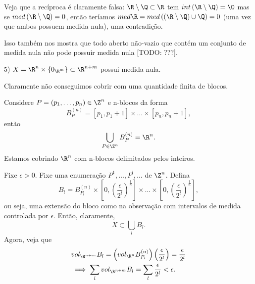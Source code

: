 \begin{note}
    Veja que a recíproca é claramente falsa:
    $\R \setminus \Q\subset \R$ tem $int\left( \R\setminus \Q \right) =\O$ mas se $med\left( \R \setminus \Q \right) = 0$, então teríamos $med \R = med\left( \left( \R \setminus \Q \right) \cup \Q \right) = 0$ (uma vez que ambos possuem medida nula), uma contradição.

    Isso também nos mostra que todo aberto não-vazio que contém um conjunto de medida nula não pode possuir medida nula [TODO: ???].
\end{note}

\begin{eg}
    5) $X =  \R^{n} \times \left\{ 0_{\R^{m}} \right\} \subset \R^{n+m}$ possui medida nula.

    Claramente não conseguimos cobrir com uma quantidade finita de blocos.

    \begin{observe}
	Considere $P = (p_1,\ldots,p_n) \in \Z^{n}$ e n-blocos da forma \[
        B_P^{(n)} = \left[ p_1, p_1+1 \right] \times \ldots\times \left[ p_n, p_n+1 \right] 
        ,\] então \[
        \bigcup_{P\in \Z^{n}}B_P^{(n)} = \R^{n}
        .\] Estamos cobrindo $\R^{n}$ com n-blocos delimitados pelos inteiros.
    \end{observe}

    Fixe $\epsilon>0$. Fixe uma enumeração $P^{1},\ldots,P^{l},\ldots$ de $\Z^{n}$. Defina \[
    B_l = B^{(n)}_{P_l} \times \left[ 0, \left( \frac{\epsilon}{2^{l}} \right)^{\frac{1}{n}} \right]\times \ldots\times \left[ 0, \left( \frac{\epsilon}{2^{l}} \right)^{\frac{1}{n}} \right]
    ,\] ou seja, uma extensão do bloco como na observação com intervalos de medida controlada por $\epsilon$. Então, claramente, \[
    X \subset  \bigcup _l B_l
    .\] Agora, veja que 
    \begin{align*}
	& vol_{\R^{n+m}}B_l = \left(  vol_{\R^{n}} B_{P_l}^{(n)}\right)  \left( \frac{\epsilon}{2^{l}} \right) = \frac{\epsilon}{2^{l}} \\
	& \implies \sum_{l} vol_{\R^{n+m}}B_l = \sum_{l} \frac{\epsilon}{2^{l}} < \epsilon
    .\end{align*}
\end{eg}

